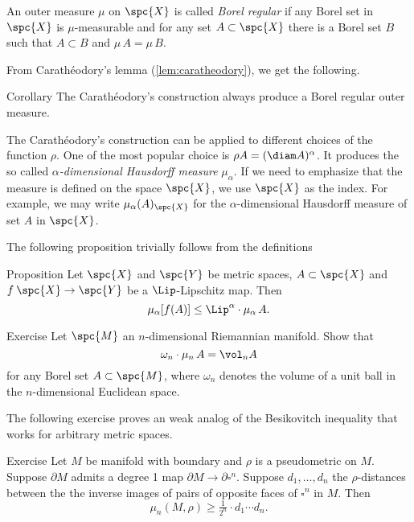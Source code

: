 An outer measure $\mu$ on $\spc{X}$ is called \emph{Borel regular} if any Borel set in $\spc{X}$ is $\mu$-measurable and for any set $A\subset \spc{X}$ there is a Borel set $B$ such that $A\subset B$ and $\mu\, A=\mu\, B$. 

From Carath\'eodory's lemma (\ref{lem:caratheodory}), we get the following.

\begin{thm}{Corollary}
The Carath\'eodory's construction always produce a Borel regular outer measure.
\end{thm}

The Carath\'eodory's construction can be applied to different choices of the function $\rho$.
One of the most popular choice is $\rho A=(\diam A)^\alpha$.
It produces the so called \emph{$\alpha$-dimensional Hausdorff measure} $\mu_\alpha$.
If we need to emphasize that the measure is defined on the space $\spc{X}$, we use $\spc{X}$ as the index.
For example, we may write $\mu_\alpha(A)_\spc{X}$ for the $\alpha$-dimensional Hausdorff measure of set $A$ in $\spc{X}$.

The following proposition trivially follows from the definitions

\begin{thm}{Proposition}\label{prop:bilip-measure}
Let $\spc{X}$ and $\spc{Y}$ be metric spaces, $A\subset \spc{X}$
and
 $f\: \spc{X}\to \spc{Y}$ be a $\Lip$-Lipschitz map. 
Then 
\[\mu_\alpha [f(A)]\le \Lip^\alpha\cdot\mu_\alpha\, A.\]

\end{thm}

\begin{thm}{Exercise}
Let $\spc{M}$ an $n$-dimensional Riemannian manifold.
Show that 
\[\omega_n\cdot\mu_n\,A=\vol_n A\]
for any Borel set $A\subset \spc{M}$, where $\omega_n$ denotes the volume of a unit ball in the $n$-dimensional Euclidean space.
\end{thm}

The following exercise proves an weak analog of the Besikovitch inequality that works for arbitrary metric spaces.

\begin{thm}{Exercise}
Let $M$ be manifold with boundary and $\rho$ is a pseudometric on $M$.
Suppose $\partial M$ admits a degree 1 map $\partial M\to\partial\square^n$. 
Suppose $d_1,\dots, d_n$ the $\rho$-distances between the the inverse images of pairs of opposite faces of $\square^n$ in $M$.
Then 
\[\mu_n(M,\rho)\ge \tfrac1{2^n}\cdot d_1\cdots d_n.\]
\end{thm}

